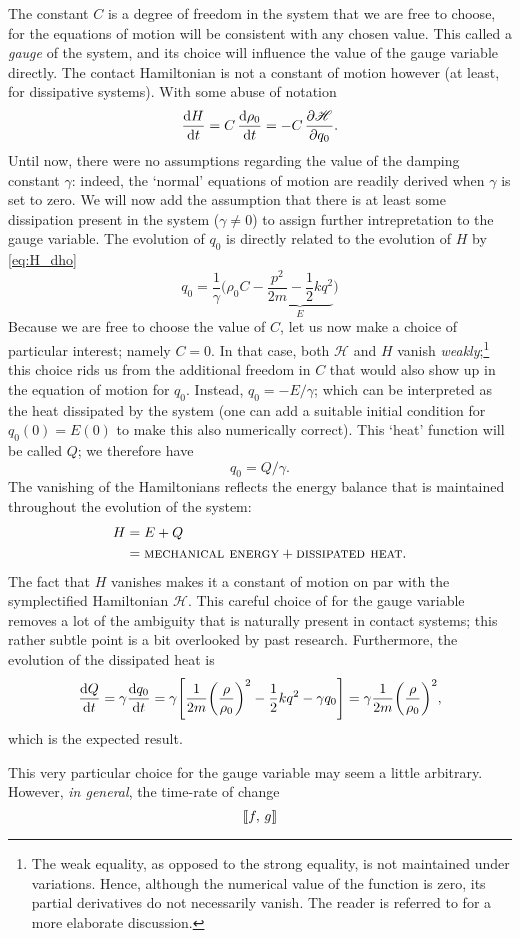 The constant $C$ is a degree of freedom in the system that we are free to choose, for the equations of motion will be consistent with any chosen value. This called a \emph{gauge} of the system, and its choice will influence the value of the gauge variable directly. The contact Hamiltonian is not a constant of motion however (at least, for dissipative systems). With some abuse of notation
$$ \dv{H}{t} = C\,\dv{\rho_0}{t}  = -C\,\pdv{\mathscr{H}}{q_0}.$$
Until now, there were no assumptions regarding the value of the damping constant $\gamma$: indeed, the `normal' equations of motion are readily derived when $\gamma$ is set to zero. We will now add the assumption that there is at least some dissipation present in the system ($\gamma \neq 0$) to assign further intrepretation to the gauge variable. The evolution of $q_0$ is directly related to the evolution of $H$ by \cref{eq:H_dho}
$$ 
    q_0 = \frac{1}{\gamma} \bigg(\rho_0 C - \underbrace{\frac{p^2}{2m} - \frac{1}{2}kq^2}_{E}\bigg)
$$
Because we are free to choose the value of $C$, let us now make a choice of particular interest; namely $C = 0$. In that case, both $\mathscr{H}$ and $H$ vanish \emph{weakly};\footnote
{The weak equality, as opposed to the strong equality, is not maintained under variations. Hence, although the numerical value of the function is zero, its partial derivatives do not necessarily vanish. The reader is referred to \citet{Dirac1950} for a more elaborate discussion.}
this choice rids us from the additional freedom in $C$ that would also show up in the equation of motion for $q_0$. Instead, $q_0 = - E/\gamma$; which can be interpreted as the heat dissipated by the system (one can add a suitable initial condition for $q_0(0) = E(0)$ to make this also numerically correct). This `heat' function will be called $Q$; we therefore have
$$ q_0 = Q/\gamma. $$
The vanishing of the Hamiltonians reflects the energy balance that is maintained throughout the evolution of the system:
\begin{equation*}
    \begin{split}
        H &= E + Q \\
          &= \text{\textsc{mechanical energy}} + \text{\textsc{dissipated heat}}.
    \end{split}
\end{equation*}
The fact that $H$ vanishes makes it a constant of motion on par with the symplectified Hamiltonian $\mathscr{H}$. This careful choice of for the gauge variable removes a lot of the ambiguity that is naturally present in contact systems; this rather subtle point is a bit overlooked by past research. \cite{Bravetti2017} 
Furthermore, the evolution of the dissipated heat is
$$ \dv{Q}{t} = \gamma \dv{q_0}{t} = \gamma \qty[\frac{1}{2m}\qty(\frac{\rho}{\rho_0})^2 - \frac{1}{2}kq^2 - \gamma q_0] = \gamma\frac{1}{2m}\qty(\frac{\rho}{\rho_0})^2, $$
which is the expected result.

This very particular choice for the gauge variable may seem a little arbitrary. However, \emph{in general}, the time-rate of change
$$
    \left\llbracket f,\,g\right\rrbracket
$$


